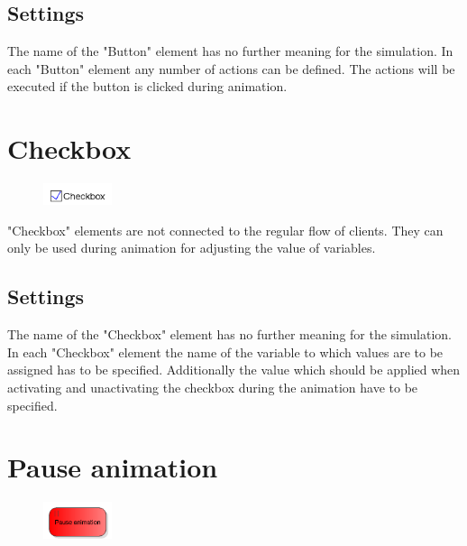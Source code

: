 \subsection*{Settings}

The name of the "Button" element has no further meaning for the simulation.
In each "Button" element any number of actions can be defined. The actions will
be executed if the button is clicked during animation.


\section{Checkbox}
\label{ref:ModelElementInteractiveCheckbox}

\begin{figure}
\vspace{-22pt}
\includegraphics[width=2cm]{imageModelElementInteractiveCheckbox.png}
\vspace{-22pt}
\end{figure}

"Checkbox" elements are not connected to the regular flow of clients.
They can only be used during animation for adjusting the value of
variables.

\subsection*{Settings}

The name of the "Checkbox" element has no further meaning for the simulation.
In each "Checkbox" element the name of the variable to which values are to
be assigned has to be specified. Additionally the value which should be
applied when activating and unactivating the checkbox during the animation
have to be specified.  


\section{Pause animation}
\label{ref:ModelElementAnimationPause}

\begin{figure}
\vspace{-22pt}
\includegraphics[width=2cm]{imageModelElementAnimationPause.png}
\vspace{-22pt}
\end{figure}

